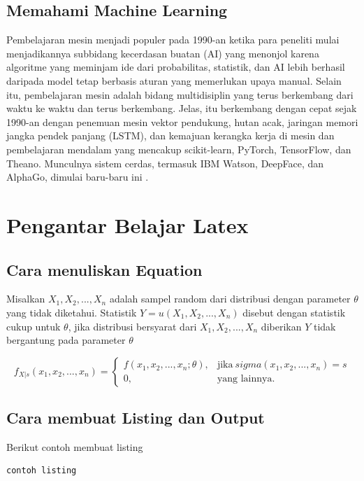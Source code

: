 \documentclass[a4paper,12pt]{article}
\theoremstyle{definition}
\begin{document}
\subsection{Memahami Machine Learning}
Pembelajaran mesin menjadi populer pada 1990-an ketika para peneliti mulai menjadikannya subbidang kecerdasan buatan (AI) yang menonjol karena algoritme yang meminjam ide dari probabilitas, statistik, dan AI lebih berhasil daripada model tetap berbasis aturan yang memerlukan upaya manual. Selain itu, pembelajaran mesin adalah bidang multidisiplin yang terus berkembang dari waktu ke waktu dan terus berkembang. Jelas, itu berkembang dengan cepat sejak 1990-an dengan penemuan mesin vektor pendukung, hutan acak, jaringan memori jangka pendek panjang (LSTM), dan kemajuan kerangka kerja di mesin dan pembelajaran mendalam yang mencakup scikit-learn, PyTorch, TensorFlow, dan Theano. Munculnya sistem cerdas, termasuk IBM Watson, DeepFace, dan AlphaGo, dimulai baru-baru ini \citep{Sarkar2018}.







\section{Pengantar Belajar Latex} 
\subsection{Cara menuliskan Equation}
Misalkan $X_1,X_2,...,X_n$ adalah sampel random dari distribusi dengan parameter $\theta$ yang tidak diketahui. Statistik $Y=u(X_1,X_2,...,X_n)$ disebut dengan statistik cukup untuk $\theta$, jika distribusi bersyarat dari $X_1,X_2,...,X_n$ diberikan $Y$ tidak bergantung pada parameter $\theta$

\begin{equation*}
    f_{X|s}(x_1,x_2,...,x_n)=
    \begin{cases}
    f(x_1, x_2, ..., x_n;\theta), & \text{jika} ~ sigma(x_1,x_2,...,x_n)=s \\ 
    0, & \text{yang lainnya}.
    \end{cases}
\end{equation*}


\subsection{Cara membuat Listing dan Output}
Berikut contoh membuat listing 
\begin{lstlisting}
contoh listing

\end{lstlisting}
\end{document}
